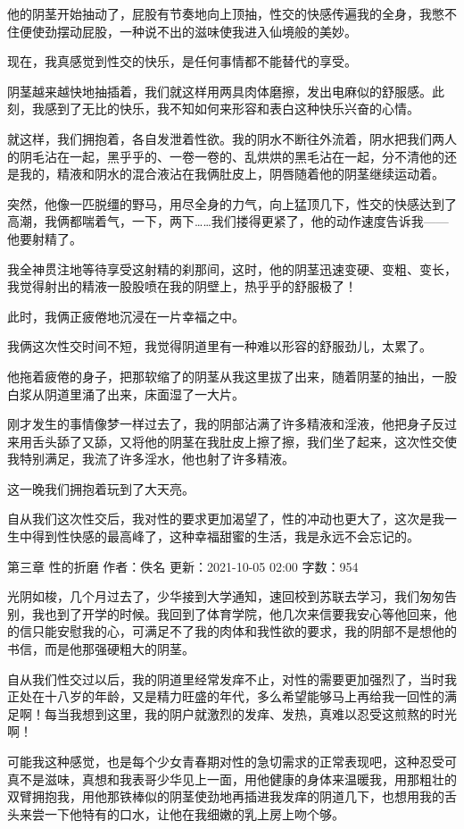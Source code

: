 \documentclass[12pt,UTF8]{ctexbook}
\begin{document}
他的阴茎开始抽动了，屁股有节奏地向上顶抽，性交的快感传遍我的全身，我憋不住便使劲摆动屁股，一种说不出的滋味使我进入仙境般的美妙。

现在，我真感觉到性交的快乐，是任何事情都不能替代的享受。

阴茎越来越快地抽插着，我们就这样用两具肉体磨擦，发出电麻似的舒服感。此刻，我感到了无比的快乐，我不知如何来形容和表白这种快乐兴奋的心情。

就这样，我们拥抱着，各自发泄着性欲。我的阴水不断往外流着，阴水把我们两人的阴毛沾在一起，黑乎乎的、一卷一卷的、乱烘烘的黑毛沾在一起，分不清他的还是我的，精液和阴水的混合液沾在我俩肚皮上，阴唇随着他的阴茎继续运动着。

突然，他像一匹脱缰的野马，用尽全身的力气，向上猛顶几下，性交的快感达到了高潮，我俩都喘着气，一下，两下……我们搂得更紧了，他的动作速度告诉我——他要射精了。

我全神贯注地等待享受这射精的刹那间，这时，他的阴茎迅速变硬、变粗、变长，我觉得射出的精液一股股喷在我的阴壁上，热乎乎的舒服极了！

此时，我俩正疲倦地沉浸在一片幸福之中。

我俩这次性交时间不短，我觉得阴道里有一种难以形容的舒服劲儿，太累了。

他拖着疲倦的身子，把那软缩了的阴茎从我这里拔了出来，随着阴茎的抽出，一股白浆从阴道里涌了出来，床面湿了一大片。

刚才发生的事情像梦一样过去了，我的阴部沾满了许多精液和淫液，他把身子反过来用舌头舔了又舔，又将他的阴茎在我肚皮上擦了擦，我们坐了起来，这次性交使我特别满足，我流了许多淫水，他也射了许多精液。

这一晚我们拥抱着玩到了大天亮。

自从我们这次性交后，我对性的要求更加渴望了，性的冲动也更大了，这次是我一生中得到性快感的最高峰了，这种幸福甜蜜的生活，我是永远不会忘记的。

第三章 性的折磨
作者：佚名      更新：2021-10-05 02:00      字数：954

光阴如梭，几个月过去了，少华接到大学通知，速回校到苏联去学习，我们匆匆告别，我也到了开学的时候。我回到了体育学院，他几次来信要我安心等他回来，他的信只能安慰我的心，可满足不了我的肉体和我性欲的要求，我的阴部不是想他的书信，而是他那强硬粗大的阴茎。

自从我们性交过以后，我的阴道里经常发痒不止，对性的需要更加强烈了，当时我正处在十八岁的年龄，又是精力旺盛的年代，多么希望能够马上再给我一回性的满足啊！每当我想到这里，我的阴户就激烈的发痒、发热，真难以忍受这煎熬的时光啊！

可能我这种感觉，也是每个少女青春期对性的急切需求的正常表现吧，这种忍受可真不是滋味，真想和我表哥少华见上一面，用他健康的身体来温暖我，用那粗壮的双臂拥抱我，用他那铁棒似的阴茎使劲地再插进我发痒的阴道几下，也想用我的舌头来尝一下他特有的口水，让他在我细嫩的乳上房上吻个够。
\end{document}
